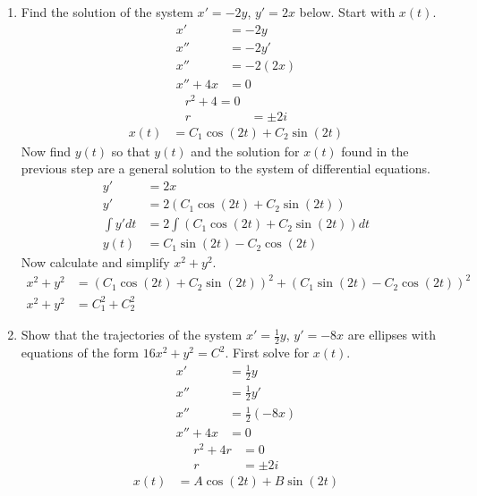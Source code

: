 \documentclass{article}
\begin{document}
\begin{enumerate}[label = \textbf{(\alph*)}]
	\item
		Find the solution of the system $ x' = -2y $, $ y' = 2x $ below. Start with $ x(t) $.
		\begin{align*}
			x' & = -2y \\
			x'' & = -2y' \\
			x'' & = -2(2x) \\
			x'' + 4x & = 0
		\end{align*}
		\begin{align*}
			r^2 + 4 = 0 \\
			r & = \pm 2i
		\end{align*}
		\begin{align*}
			x(t) & = C_1\cos(2t) + C_2\sin(2t)
		\end{align*}
		Now find $ y(t) $ so that $ y(t) $ and the solution for $ x(t) $ found in the previous step are a general solution to the system of differential equations.
		\begin{align*}
			y' & = 2x \\
			y' & = 2(C_1\cos(2t) + C_2\sin(2t)) \\
			\int y' dt & = 2 \int \left( C_1\cos(2t) + C_2\sin(2t) \right) dt \\
			y(t) & = C_1\sin(2t) - C_2\cos(2t)
		\end{align*}
		Now calculate and simplify $ x^2 + y^2 $.
		\begin{align*}
			x^2 + y^2 & = (C_1\cos(2t) + C_2\sin(2t))^2 + (C_1\sin(2t) - C_2\cos(2t))^2 \\
			x^2 + y^2 & = C_1^2 + C_2^2
		\end{align*}
	\item
		Show that the trajectories of the system $ x' = \frac{1}{2}y $, $ y' = -8x $ are ellipses with equations of the form $ 16x^2 + y^2 = C^2 $. First solve for $ x(t) $.
		\begin{align*}
			x' & = \frac{1}{2}y \\
			x'' & = \frac{1}{2}y' \\
			x'' & = \frac{1}{2}(-8x) \\
			x'' + 4x & = 0
		\end{align*}
		\begin{align*}
			r^2 + 4r & = 0 \\
			r & = \pm 2i
		\end{align*}
		\begin{align*}
			x(t) & = A\cos(2t) + B\sin(2t)
		\end{align*}

\end{enumerate}
\end{document}
